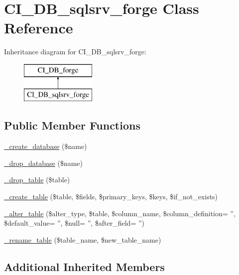 \hypertarget{class_c_i___d_b__sqlsrv__forge}{\section{C\-I\-\_\-\-D\-B\-\_\-sqlsrv\-\_\-forge Class Reference}
\label{class_c_i___d_b__sqlsrv__forge}
}
Inheritance diagram for C\-I\-\_\-\-D\-B\-\_\-sqlsrv\-\_\-forge\-:\begin{figure}[H]
\begin{center}
\leavevmode
\includegraphics[height=2.000000cm]{class_c_i___d_b__sqlsrv__forge}
\end{center}
\end{figure}
\subsection*{Public Member Functions}
\begin{DoxyCompactItemize}
\item 
\hyperlink{class_c_i___d_b__sqlsrv__forge_ac70184ae4a86e97f324daa1901b78777}{\-\_\-create\-\_\-database} (\$name)
\item 
\hyperlink{class_c_i___d_b__sqlsrv__forge_a6e04d0af5e8e1e1f93f42d63f0744bfd}{\-\_\-drop\-\_\-database} (\$name)
\item 
\hyperlink{class_c_i___d_b__sqlsrv__forge_a147efb0d859b7cf4148ff75642515231}{\-\_\-drop\-\_\-table} (\$table)
\item 
\hyperlink{class_c_i___d_b__sqlsrv__forge_a99d4c17257f468337344690dd590582b}{\-\_\-create\-\_\-table} (\$table, \$fields, \$primary\-\_\-keys, \$keys, \$if\-\_\-not\-\_\-exists)
\item 
\hyperlink{class_c_i___d_b__sqlsrv__forge_a34fc29f48662e18f6a4f3185a8ea206c}{\-\_\-alter\-\_\-table} (\$alter\-\_\-type, \$table, \$column\-\_\-name, \$column\-\_\-definition= '', \$default\-\_\-value= '', \$null= '', \$after\-\_\-field= '')
\item 
\hyperlink{class_c_i___d_b__sqlsrv__forge_aec593ba62c6ff875cafeac16b1c54ae6}{\-\_\-rename\-\_\-table} (\$table\-\_\-name, \$new\-\_\-table\-\_\-name)
\end{DoxyCompactItemize}
\subsection*{Additional Inherited Members}


